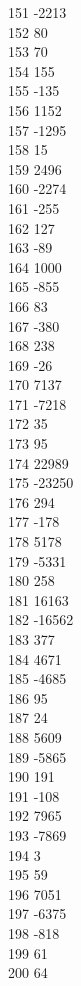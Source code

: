 { 151	-2213 \\
 152	80 \\
 153	70 \\
 154	155 \\
 155	-135 \\
 156	1152 \\
 157	-1295 \\
 158	15 \\
 159	2496 \\
 160	-2274 \\
 161	-255 \\
 162	127 \\
 163	-89 \\
 164	1000 \\
 165	-855 \\
 166	83 \\
 167	-380 \\
 168	238 \\
 169	-26 \\
 170	7137 \\
 171	-7218 \\
 172	35 \\
 173	95 \\
 174	22989 \\
 175	-23250 \\
 176	294 \\
 177	-178 \\
 178	5178 \\
 179	-5331 \\
 180	258 \\
 181	16163 \\
 182	-16562 \\
 183	377 \\
 184	4671 \\
 185	-4685 \\
 186	95 \\
 187	24 \\
 188	5609 \\
 189	-5865 \\
 190	191 \\
 191	-108 \\
 192	7965 \\
 193	-7869 \\
 194	3 \\
 195	59 \\
 196	7051 \\
 197	-6375 \\
 198	-818 \\
 199	61 \\
 200	64 \\
}
